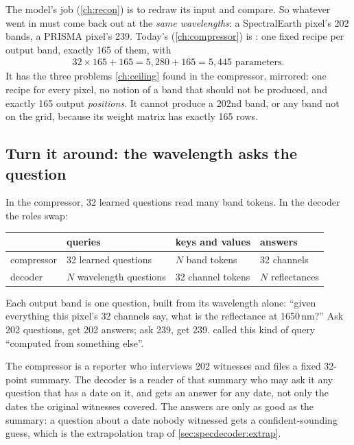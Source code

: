 The model's job (\cref{ch:recon}) is to redraw its input and compare. So whatever went in must come back out at the \emph{same wavelengths}: a SpectralEarth pixel's 202 bands, a PRISMA pixel's 239. Today's  (\cref{ch:compressor}) is : one fixed recipe per output band, exactly 165 of them, with
\begin{align*}
  32\times165 + 165 = 5{,}280 + 165 = 5{,}445 \text{ parameters.}
\end{align*}
It has the three problems \cref{ch:ceiling} found in the compressor, mirrored: one recipe for every pixel, no notion of a band that should not be produced, and exactly 165 output \emph{positions}. It cannot produce a 202nd band, or any band not on the grid, because its weight matrix has exactly 165 rows.

\subsection{Turn it around: the wavelength asks the question}

In the compressor, 32 learned questions read many band tokens. In the decoder the roles swap:
\begin{center}
\begin{tabular}{llll}\toprule
 & queries & keys and values & answers\\\midrule
compressor & 32 learned questions & $N$ band tokens & 32 channels\\
decoder & $N$ wavelength questions & 32 channel tokens & $N$ reflectances\\\bottomrule
\end{tabular}
\end{center}
Each output band is one question, built from its wavelength alone: ``given everything this pixel's 32 channels say, what is the reflectance at 1650\,nm?'' Ask 202 questions, get 202 answers; ask 239, get 239.  called this kind of query ``computed from something else''.

\begin{analogy}
The compressor is a reporter who interviews 202 witnesses and files a fixed 32-point summary. The decoder is a reader of that summary who may ask it any question that has a date on it, and gets an answer for any date, not only the dates the original witnesses covered. The answers are only as good as the summary: a question about a date nobody witnessed gets a confident-sounding guess, which is the extrapolation trap of \cref{sec:specdecoder:extrap}.
\end{analogy}

